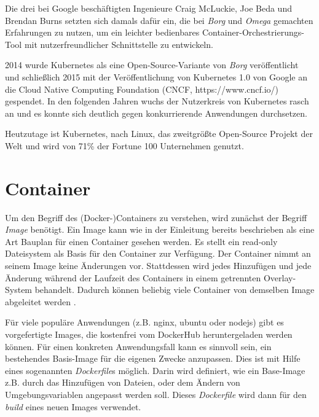 \documentclass[11pt,a4paper]{article}
\begin{document}
Die drei bei Google beschäftigten Ingenieure Craig McLuckie, Joe Beda und Brendan Burns setzten sich damals dafür ein,
die bei \emph{Borg} und \emph{Omega} gemachten Erfahrungen zu nutzen, um ein leichter bedienbares Container-Orchestrierungs-Tool 
mit nutzerfreundlicher Schnittstelle zu entwickeln.

2014 wurde Kubernetes als eine Open-Source-Variante von \emph{Borg} veröffentlicht und schließlich 2015 mit der Veröffentlichung von Kubernetes 1.0
von Google an die Cloud Native Computing Foundation (CNCF, https://www.cncf.io/) gespendet. In den folgenden Jahren wuchs der Nutzerkreis von Kubernetes
rasch an und es konnte sich deutlich gegen konkurrierende Anwendungen durchsetzen.

Heutzutage ist Kubernetes, nach Linux, das zweitgrößte Open-Source Projekt der Welt und wird von 71\% der Fortune 100 Unternehmen genutzt. %

\section{Container}
\label{sec:Container}

Um den Begriff des (Docker-)Containers zu verstehen, wird zunächst der Begriff \emph{Image} benötigt.
Ein Image kann wie in der Einleitung bereits beschrieben als eine Art Bauplan für einen Container gesehen werden.
Es stellt ein read-only Dateisystem als Basis für den Container zur Verfügung. Der Container nimmt an seinem Image
keine Änderungen vor. Stattdessen wird jedes Hinzufügen und jede Änderung während der Laufzeit des Containers in einem
getrennten Overlay-System behandelt. Dadurch können beliebig viele Container von demselben Image abgeleitet werden \cite{kofler2021docker}. 

Für viele populäre Anwendungen (z.B. nginx, ubuntu oder nodejs) gibt es vorgefertigte Images, die kostenfrei vom DockerHub %
heruntergeladen werden können.
Für einen konkreten Anwendungsfall kann es sinnvoll sein, ein bestehendes Basis-Image für die eigenen Zwecke anzupassen.
Dies ist mit Hilfe eines sogenannten \emph{Dockerfile}s möglich. Darin wird definiert, wie ein Base-Image z.B. durch das Hinzufügen von Dateien,
oder dem Ändern von Umgebungsvariablen angepasst werden soll. Dieses \emph{Dockerfile} wird dann für den \emph{build}
eines neuen Images verwendet.
\end{document}
